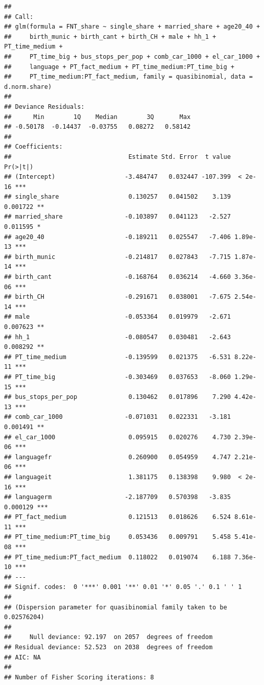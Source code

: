 \documentclass[
]{article}
\begin{document}
\begin{verbatim}
## 
## Call:
## glm(formula = FNT_share ~ single_share + married_share + age20_40 + 
##     birth_munic + birth_cant + birth_CH + male + hh_1 + PT_time_medium + 
##     PT_time_big + bus_stops_per_pop + comb_car_1000 + el_car_1000 + 
##     language + PT_fact_medium + PT_time_medium:PT_time_big + 
##     PT_time_medium:PT_fact_medium, family = quasibinomial, data = d.norm.share)
## 
## Deviance Residuals: 
##      Min        1Q    Median        3Q       Max  
## -0.50178  -0.14437  -0.03755   0.08272   0.58142  
## 
## Coefficients:
##                                Estimate Std. Error  t value Pr(>|t|)    
## (Intercept)                   -3.484747   0.032447 -107.399  < 2e-16 ***
## single_share                   0.130257   0.041502    3.139 0.001722 ** 
## married_share                 -0.103897   0.041123   -2.527 0.011595 *  
## age20_40                      -0.189211   0.025547   -7.406 1.89e-13 ***
## birth_munic                   -0.214817   0.027843   -7.715 1.87e-14 ***
## birth_cant                    -0.168764   0.036214   -4.660 3.36e-06 ***
## birth_CH                      -0.291671   0.038001   -7.675 2.54e-14 ***
## male                          -0.053364   0.019979   -2.671 0.007623 ** 
## hh_1                          -0.080547   0.030481   -2.643 0.008292 ** 
## PT_time_medium                -0.139599   0.021375   -6.531 8.22e-11 ***
## PT_time_big                   -0.303469   0.037653   -8.060 1.29e-15 ***
## bus_stops_per_pop              0.130462   0.017896    7.290 4.42e-13 ***
## comb_car_1000                 -0.071031   0.022331   -3.181 0.001491 ** 
## el_car_1000                    0.095915   0.020276    4.730 2.39e-06 ***
## languagefr                     0.260900   0.054959    4.747 2.21e-06 ***
## languageit                     1.381175   0.138398    9.980  < 2e-16 ***
## languagerm                    -2.187709   0.570398   -3.835 0.000129 ***
## PT_fact_medium                 0.121513   0.018626    6.524 8.61e-11 ***
## PT_time_medium:PT_time_big     0.053436   0.009791    5.458 5.41e-08 ***
## PT_time_medium:PT_fact_medium  0.118022   0.019074    6.188 7.36e-10 ***
## ---
## Signif. codes:  0 '***' 0.001 '**' 0.01 '*' 0.05 '.' 0.1 ' ' 1
## 
## (Dispersion parameter for quasibinomial family taken to be 0.02576204)
## 
##     Null deviance: 92.197  on 2057  degrees of freedom
## Residual deviance: 52.523  on 2038  degrees of freedom
## AIC: NA
## 
## Number of Fisher Scoring iterations: 8
\end{verbatim}
\end{document}

